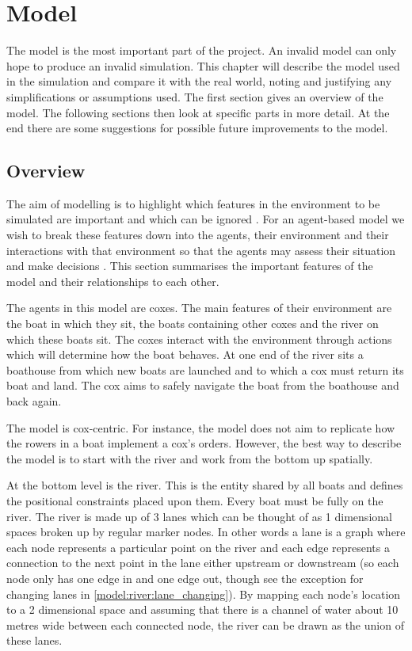 \chapter{Model} \label{chapter:model}
  The model is the most important part of the project. An invalid model can only hope to produce an invalid simulation. This chapter will describe the model used in the simulation and compare it with the real world, noting and justifying any simplifications or assumptions used. The first section gives an overview of the model. The following sections then look at specific parts in more detail. At the end there are some suggestions for possible future improvements to the model.
  
  \section{Overview}
    The aim of modelling is to highlight which features in the environment to be simulated are important and which can be ignored \cite{Sterling2009}. For an agent-based model we wish to break these features down into the agents, their environment and their interactions with that environment so that the agents may assess their situation and make decisions \cite{Bonabeau2002}. This section summarises the important features of the model and their relationships to each other.
    
    The agents in this model are coxes. The main features of their environment are the boat in which they sit, the boats containing other coxes and the river on which these boats sit. The coxes interact with the environment through actions which will determine how the boat behaves. At one end of the river sits a boathouse from which new boats are launched and to which a cox must return its boat and land. The cox aims to safely navigate the boat from the boathouse and back again.
    
    The model is cox-centric. For instance, the model does not aim to replicate how the rowers in a boat implement a cox's orders. However, the best way to describe the model is to start with the river and work from the bottom up spatially.
    
    At the bottom level is the river. This is the entity shared by all boats and defines the positional constraints placed upon them. Every boat must be fully on the river. The river is made up of 3 lanes which can be thought of as 1 dimensional spaces broken up by regular marker nodes. In other words a lane is a graph where each node represents a particular point on the river and each edge represents a connection to the next point in the lane either upstream or downstream (so each node only has one edge in and one edge out, though see the exception for changing lanes in \ref{model:river:lane_changing}). By mapping each node's location to a 2 dimensional space and assuming that there is a channel of water about 10 metres wide between each connected node, the river can be drawn as the union of these lanes.
    
